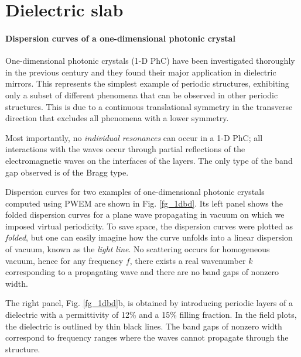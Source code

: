 \label{chapter_results}
\section{Dielectric slab} \label{section_Dielectric slab}%
\paragraph{Dispersion curves of a one-dimensional photonic crystal}%
One-dimensional photonic crystals (1-D PhC) have been investigated thoroughly in the previous century and they found their major application in dielectric mirrors. This represents the simplest example of periodic structures, exhibiting only a subset of different phenomena that can be observed in other periodic structures. This is due to a continuous translational symmetry in the transverse direction that excludes all phenomena with a lower symmetry. 

Most importantly, no \textit{individual resonances} can occur in a 1-D PhC; all interactions with the waves occur through partial reflections of the electromagnetic waves on the interfaces of the layers. The only type of the band gap observed is of the Bragg type.

Dispersion curves for two examples of one-dimensional photonic crystals computed using PWEM are shown in Fig. \ref{fg_1dbd}. 
Its left panel shows the folded dispersion curves for a plane wave propagating in vacuum on which we imposed virtual periodicity. To save space, the dispersion curves were plotted as \textit{folded}, but one can easily imagine how the curve unfolds into a linear dispersion of vacuum, known as the \textit{light line}. No scattering occurs for homogeneous vacuum, hence for any frequency $f$, there exists a real wavenumber $k$ corresponding to a propagating wave and there are no band gaps of nonzero width. 

The right panel, Fig. \ref{fg_1dbd}b, is obtained by introducing periodic layers of a dielectric with a permittivity of 12\% and a 15\% filling fraction. In the field plots, the dielectric is outlined by thin black lines. The band gaps of nonzero width correspond to frequency ranges where the waves cannot propagate through the structure. %

